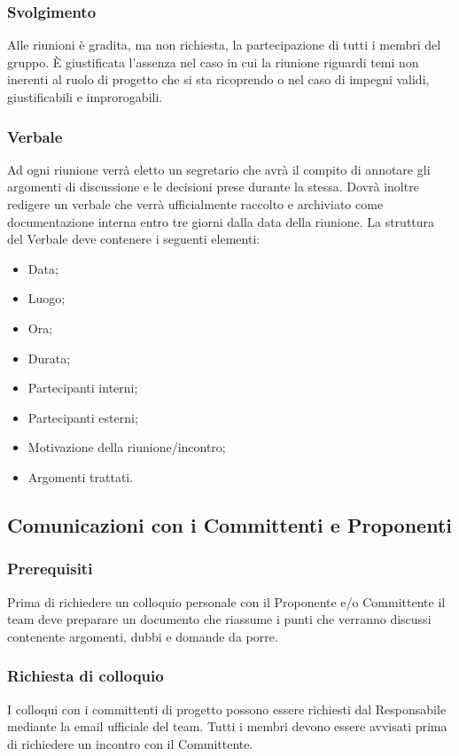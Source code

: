 \subsubsection{Svolgimento}
\label{3.3.2}
Alle riunioni è gradita, ma non richiesta, la partecipazione di tutti i membri del gruppo. È giustificata l'assenza nel caso in cui la riunione riguardi temi non inerenti al ruolo di progetto che si sta ricoprendo o nel caso di impegni validi, giustificabili e improrogabili.

\subsubsection{Verbale}
\label{3.3.3}
Ad ogni riunione verrà eletto un segretario che avrà il compito di annotare gli argomenti di discussione e le decisioni prese durante la stessa.
Dovrà inoltre redigere un verbale che verrà ufficialmente raccolto e archiviato come documentazione interna entro tre giorni dalla data della riunione.
La struttura del Verbale deve contenere i seguenti elementi:
\begin{itemize}
\item Data;
\item Luogo;
\item Ora;
\item Durata;
\item Partecipanti interni;
\item Partecipanti esterni;
\item Motivazione della riunione/incontro;
\item Argomenti trattati.
\end{itemize}

\subsection{Comunicazioni con i Committenti e Proponenti}
\label{3.4}

\subsubsection{Prerequisiti}
\label{3.4.1}
Prima di richiedere un colloquio personale con il Proponente e/o Committente il team deve preparare un documento che riassume i punti che verranno discussi contenente argomenti, dubbi e domande da porre.

\subsubsection{Richiesta di colloquio}
\label{3.4.2}
I colloqui con i committenti di progetto possono essere richiesti dal Responsabile mediante la email ufficiale del team. Tutti i membri devono essere avvisati prima di richiedere un incontro con il Committente.

